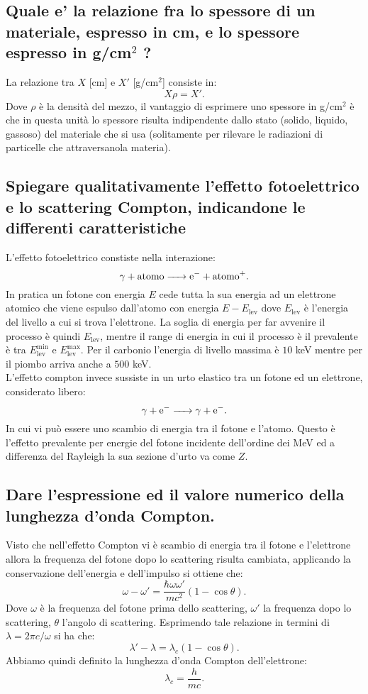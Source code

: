\subsection[]{Quale e' la relazione fra lo spessore di un materiale, espresso in cm, e lo spessore espresso in g/cm$^2$ ?
} \label{sec:4.a.1}
La relazione tra $X$ [cm] e $X'$ [g/cm$^2$] consiste in:
\[
	X\rho = X'
.\] 
Dove $\rho$ è la densità del mezzo, il vantaggio di esprimere uno spessore in g/cm$^2$ è che in questa unità lo spessore risulta indipendente dallo stato (solido, liquido, gassoso) del materiale che si usa (solitamente per rilevare le radiazioni di particelle che attraversanola materia).
\subsection[]{Spiegare qualitativamente l’effetto fotoelettrico e lo scattering Compton, indicandone le differenti caratteristiche
}\label{sec:4.a.2}
L'effetto fotoelettrico constiste nella interazione:
\[
	\ce{\ce{\gamma} +  \text{atomo} -> \ce{e^-} + \text{atomo}+}
.\] 
In pratica un fotone con energia $E$ cede tutta la sua energia ad un elettrone atomico che viene espulso dall'atomo con energia $E-E_{\text{lev}}$ dove $E_{\text{lev}}$ è l'energia del livello a cui si trova l'elettrone. La soglia di energia per far avvenire il processo è quindi $E_{\text{lev}}$, mentre il range di energia in cui il processo è il prevalente è tra $E^{\text{min}}_{\text{lev}}$ e $E^{\text{max}}_{\text{lev}}$. Per il carbonio l'energia di livello massima è $10$ keV mentre per il piombo arriva anche a $500$ keV.\\
L'effetto compton invece sussiste in un urto elastico tra un fotone ed un elettrone, considerato libero:
\[
	\ce{\ce{\gamma} + e- -> \ce{\gamma} + e- }
.\] 
In cui vi può essere uno scambio di energia tra il fotone e l'atomo. Questo è l'effetto prevalente per energie del fotone incidente dell'ordine dei MeV ed a differenza del Rayleigh la sua sezione d'urto va come $Z$.
\subsection[]{Dare l'espressione ed il valore numerico della lunghezza d'onda Compton.
}\label{sec:4.a.3}
Visto che nell'effetto Compton vi è scambio di energia tra il fotone e l'elettrone allora la frequenza del fotone dopo lo scattering risulta cambiata, applicando la conservazione dell'energia e dell'impulso si ottiene che:
\[
	\omega-\omega'= \frac{\hbar \omega\omega'}{mc^2}\left( 1-\cos\theta \right) 
.\]
Dove $\omega$ è la frequenza del fotone prima dello scattering, $\omega'$ la frequenza dopo lo scattering, $\theta$ l'angolo di scattering.
Esprimendo tale relazione in termini di $\lambda= 2\pi c/ \omega$ si ha che:
\[
	\lambda'-\lambda= \lambda_{c}\left( 1-\cos\theta \right) 
.\] 
Abbiamo quindi definito la lunghezza d'onda Compton dell'elettrone:
\[
	\lambda_{c}=\frac{h}{mc}
.\] 
